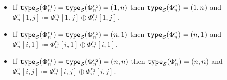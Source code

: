 \begin{itemize}
\begin{itemize}
  \item If $\texttt{type}_{\mathcal{S}}(\Phi^{e_1}_n)=\texttt{type}_{\mathcal{S}}(\Phi^{e_2}_n)=(1, n)$  then $\texttt{type}_{\mathcal{S}}(\Phi^{e}_n)=(1, n)$ and $\Phi^e_n[1,j]\coloneqq \Phi^{e_1}_n[1,j] \oplus \Phi^{e_2}_n[1,j]$.
  \item If $\texttt{type}_{\mathcal{S}}(\Phi^{e_1}_n)=\texttt{type}_{\mathcal{S}}(\Phi^{e_2}_n)=(n, 1)$  then $\texttt{type}_{\mathcal{S}}(\Phi^{e}_n)=(n, 1)$ and $\Phi^e_n[i,1]\coloneqq \Phi^{e_1}_n[i,1] \oplus \Phi^{e_2}_n[i,1]$.
  \item If $\texttt{type}_{\mathcal{S}}(\Phi^{e_1}_n)=\texttt{type}_{\mathcal{S}}(\Phi^{e_2}_n)=(n, n)$  then $\texttt{type}_{\mathcal{S}}(\Phi^{e}_n)=(n, n)$ and $\Phi^e_n[i,j]\coloneqq \Phi^{e_1}_n[i,j] \oplus \Phi^{e_2}_n[i,j]$.
\end{itemize}
%
%

\end{itemize}
